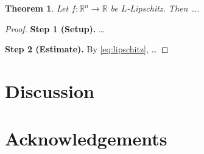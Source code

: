 \documentclass[11pt,a4paper]{article}
\theoremstyle{plain}
\newtheorem{theorem}{Theorem}[section]
\theoremstyle{definition}
\theoremstyle{remark}
\numberwithin{equation}{section}
\newcommand{\R}{\mathbb{R}}
\begin{document}
\begin{theorem}\label{thm:main}
Let $f : \R^n \to \R$ be $L$-Lipschitz. Then \dots.
\end{theorem}

\begin{proof}
\textbf{Step 1 (Setup).}
\dots

\textbf{Step 2 (Estimate).}
By \eqref{eq:lipschitz}, \dots
\end{proof}

\section{Discussion}\label{sec:discussion}

\section*{Acknowledgements}



\end{document}
